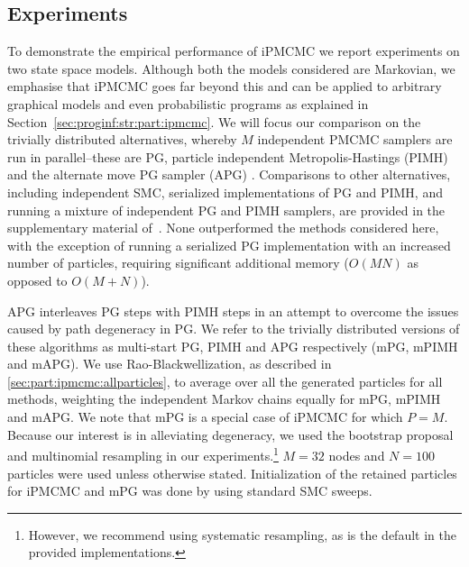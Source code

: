 
\subsection{Experiments}
\label{sec:experiments}

To demonstrate the %
empirical performance of iPMCMC we report experiments on two state space models.  
Although both the models considered are Markovian, we emphasise that iPMCMC goes far beyond this and can be applied to arbitrary graphical models
and even probabilistic programs as explained in Section~\ref{sec:proginf:str:part:ipmcmc}. 
We will focus our comparison on the trivially distributed alternatives, whereby $M$ independent PMCMC samplers are run in parallel--these are PG, particle independent Metropolis-Hastings (PIMH) \citep{andrieu2010particle} and the alternate move PG sampler (APG) \citep{holenstein2009particle}. Comparisons to other alternatives, including independent SMC, serialized implementations of PG and PIMH, and running a mixture of independent PG and PIMH samplers, are provided in the supplementary material of~\cite{rainforth2016interacting}.  
None outperformed the methods considered here, with the exception of running a serialized PG implementation with an increased number of particles, requiring significant additional memory ($O(MN)$ as opposed to $O(M+N)$).

APG interleaves PG steps with PIMH steps
in an attempt to overcome the issues caused by path degeneracy in PG.  We refer to the trivially distributed versions of these algorithms as multi-start PG, PIMH and APG respectively (mPG, mPIMH and mAPG). 
We use Rao-Blackwellization, as described in \ref{sec:part:ipmcmc:allparticles}, to average over all the generated particles for all methods, weighting the independent Markov chains equally for mPG, mPIMH and mAPG. We note that mPG is a special case of iPMCMC for which $P=M$.  Because our interest is in alleviating degeneracy, we used the bootstrap proposal and multinomial resampling in our experiments.\footnote{However, we recommend
	using systematic resampling, as is the default in the provided implementations.}
 $M=32$ nodes and $N=100$ particles were used unless otherwise stated.  Initialization of the retained particles for iPMCMC and mPG was done by using standard SMC sweeps.

